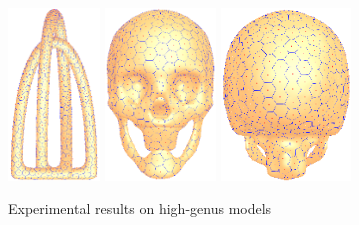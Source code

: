\begin{figure}[htbp]
\includegraphics[height=1.8in]{figs/cvt/lp_unityknot2_nf164k_1k_back.png}
\includegraphics[height=1.8in]{figs/cvt/skull_nf192k_s1k_front.png}
\includegraphics[height=1.8in]{figs/cvt/skull_nf192k_s1k_end.png}
\caption{Experimental results on high-genus models}
  \label{fig:high_genus_remesh_results}
\end{figure}

